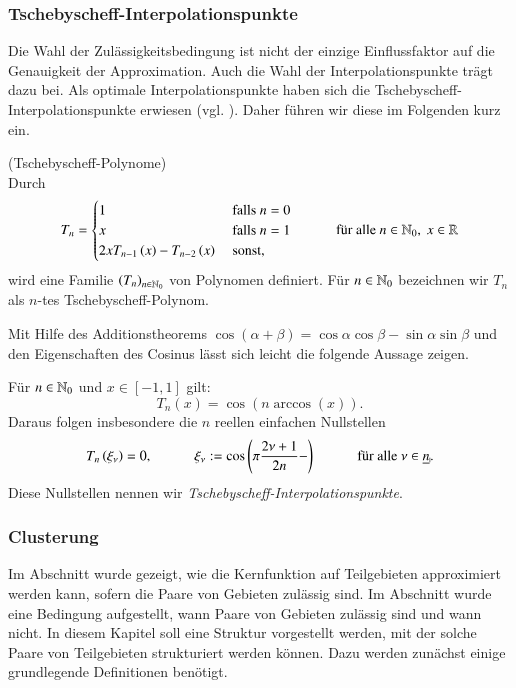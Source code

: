     \subsubsection{Tschebyscheff-Interpolationspunkte}
    \label{sek:tscheby}
      Die Wahl der Zulässigkeitsbedingung ist nicht der einzige Einflussfaktor auf die Genauigkeit der Approximation. Auch die Wahl der Interpolationspunkte trägt dazu bei.
      Als optimale Interpolationspunkte haben sich die Tschebyscheff-Interpolationspunkte erwiesen (vgl. \citet{nichtlokop}). Daher führen wir diese im Folgenden kurz ein.
      
      \begin{defn}
	(Tschebyscheff-Polynome)\\
	Durch
	\begin{equation*}
	  T_n = 
	  \begin{cases}
	    1  				& \text{ falls } n = 0\\
	    x				& \text{ falls } n = 1\\
	    2 x T_{n-1}\left(x\right) - T_{n-2}\left(x\right) & \text{ sonst,}
	  \end{cases}
	  \ \ \ \ \ \ \ \ \ \ \ \ \text{für alle } n \in \mathbb{N}_0, \ x \in \mathbb{R}
	\end{equation*}
	wird eine Familie $\left(T_n\right)_{n \in \mathbb{N}_0}$ von Polynomen definiert. Für $n \in \mathbb{N}_0$ bezeichnen wir $T_n$ als $n$-tes Tschebyscheff-Polynom.
	\citep{nichtlokop}
      \end{defn}
      
      Mit Hilfe des Additionstheorems $\cos \left(\alpha + \beta\right) = \cos \alpha \cos \beta - \sin \alpha \sin \beta$ und den Eigenschaften des Cosinus lässt sich leicht die folgende Aussage zeigen.
      
      \begin{lemdef}
	Für $n \in \mathbb{N}_0$ und $x \in [-1,1]$ gilt:
	\[
	  T_n\left(x\right) = \cos \left( n \arccos \left(x\right) \right).
	\]
	Daraus folgen insbesondere die $n$ reellen einfachen Nullstellen
	\[
	  T_n\left( \xi_\nu \right) = 0, \ \ \ \ \ \ \ \ \ \ \ \ \xi_\nu := \cos \left(\pi \frac{2\nu + 1}{2n} -\right) \ \ \ \ \ \ \ \ \ \ \ \ \text{für alle } \nu \in \haken{n}.
	\]
	Diese Nullstellen nennen wir \textit{Tschebyscheff-Interpolationspunkte}.
	\citep{nichtlokop}
      \end{lemdef}
      
    \subsubsection{Clusterung}
    \label{sek:cluster}
      Im Abschnitt  wurde gezeigt, wie die Kernfunktion auf Teilgebieten approximiert werden kann, sofern die Paare von Gebieten zulässig sind.
      Im Abschnitt  wurde eine Bedingung aufgestellt, wann Paare von Gebieten zulässig sind und wann nicht.
      In diesem Kapitel soll eine Struktur vorgestellt werden, mit der solche Paare von Teilgebieten strukturiert werden können.
      Dazu werden zunächst einige grundlegende Definitionen benötigt.
      
